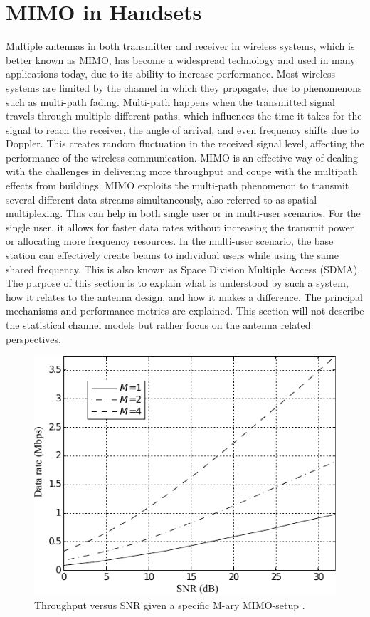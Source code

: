 \section{MIMO in Handsets}
\label{sec:mimo_in_handsets}
Multiple antennas in both transmitter and receiver in wireless systems, which is better known as MIMO, has become a widespread technology and used in many applications today, due to its ability to increase performance. Most wireless systems are limited by the channel in which they propagate, due to phenomenons such as multi-path fading. Multi-path happens when the transmitted signal travels through multiple different paths, which influences the time it takes for the signal to reach the receiver, the angle of arrival, and even frequency shifts due to Doppler. This creates random fluctuation in the received signal level, affecting the performance of the wireless communication. MIMO is an effective way of dealing with the challenges in delivering more throughput and coupe with the multipath effects from buildings. MIMO exploits the multi-path phenomenon to transmit several different data streams simultaneously, also referred to as spatial multiplexing. This can help in both single user or in multi-user scenarios. For the single user, it allows for faster data rates without increasing the transmit power or allocating more frequency resources. In the multi-user scenario, the base station can effectively create beams to individual users while using the same shared frequency. This is also known as Space Division Multiple Access (SDMA). The purpose of this section is to explain what is understood by such a system, how it relates to the antenna design, and how it makes a difference. The principal mechanisms and performance metrics are explained. This section will not describe the statistical channel models but rather focus on the antenna related perspectives. 

\begin{figure}[htbp]
  \centering
  \includegraphics[scale=1.2]{img/analysis/datarateMimo}
  \caption{Throughput versus SNR given a specific M-ary MIMO-setup \cite{Ezio2007MIMO}.}
  \label{fig:mimo-throughput}
\end{figure}

